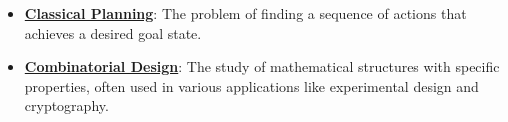 \documentclass{article}%
\begin{document}
\begin{itemize}[leftmargin=*]
\item \href{https://purdue.brightspace.com/d2l/common/assets/pdfjs-d2l-dist/1.0.14-legacy/web/viewer.html?file=\%2Fcontent\%2Fenforced\%2F1095467-wl.202510.CS.24300.001\%2F13L1-Logic.pdf\%3Fou\%3D1095467\&lang=en-us\&container=d2l-fileviewer-rendered-pdf\&fullscreen=d2l-fileviewer-rendered-pdf-dialog\&height=667#page=21}{\textbf{Classical Planning}}: The problem of finding a sequence of actions that achieves a desired goal state.%
\item \href{https://purdue.brightspace.com/d2l/common/assets/pdfjs-d2l-dist/1.0.14-legacy/web/viewer.html?file=\%2Fcontent\%2Fenforced\%2F1095467-wl.202510.CS.24300.001\%2F13L1-Logic.pdf\%3Fou\%3D1095467\&lang=en-us\&container=d2l-fileviewer-rendered-pdf\&fullscreen=d2l-fileviewer-rendered-pdf-dialog\&height=667#page=22}{\textbf{Combinatorial Design}}: The study of mathematical structures with specific properties, often used in various applications like experimental design and cryptography.%
\end{itemize}%
\end{document}
